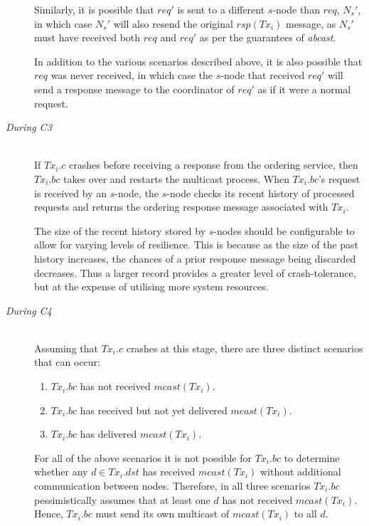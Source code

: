 \begin{description}
        Similarly, it is possible that $req'$ is sent to a different $s$-node than $req$, $N_s'$, in which case $N_s'$ will also resend the original $rsp(Tx_i)$ message, as $N_s'$ must have received both $req$ and $req'$ as per the guarantees of \emph{abcast}.  
        
        In addition to the various scenarios described above, it is also possible that $req$ was never received, in which case the $s$-node that received $req'$ will send a response message to the coordinator of $req'$ as if it were a normal request.  
        
        \item[\emph{During C3}]  \hfill \\
        If $Tx_i.c$ crashes before receiving a response from the ordering service, then $Tx_i.bc$ takes over and restarts the multicast process.  When $Tx_i.bc$'s request is received by an $s$-node, the $s$-node checks its recent history of processed requests and returns the ordering response message associated with $Tx_i$.  
        
        The size of the recent history stored by $s$-nodes should be configurable to allow for varying levels of resilience.   This is because as the size of the past history increases, the chances of a prior response message being discarded decreases.  Thus a larger record provides a greater level of crash-tolerance, but at the expense of utilising more system resources.  
        
        \item[\emph{During C4}]  \hfill \\
                Assuming that $Tx_i.c$ crashes at this stage, there are three distinct scenarios that can occur:
                
                \begin{enumerate}[label=\roman*]
                    \item    $Tx_i.bc$ has not received $mcast(Tx_i)$.                  
                
                    \item    $Tx_i.bc$ has received but not yet delivered $mcast(Tx_i)$.
                    
                    \item    $Tx_i.bc$ has delivered $mcast(Tx_i)$.  
                \end{enumerate}
                
                For all of the above scenarios it is not possible for $Tx_i.bc$ to determine whether any $d \in Tx_i.dst$ has received $mcast(Tx_i)$ without additional communication between nodes.  Therefore, in all three scenarios $Tx_i.bc$ pessimistically assumes that at least one $d$ has not received $mcast(Tx_i)$.  Hence, $Tx_i.bc$ must send its own multicast of $mcast(Tx_i)$ to all $d$.  


\end{description}
